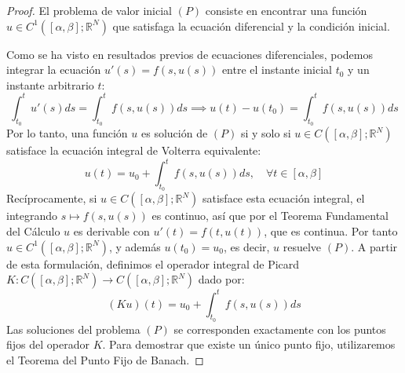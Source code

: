 \begin{proof}
    El problema de valor inicial $(P)$ consiste en encontrar una función $u \in C^1([\alpha, \beta]; \mathbb{R}^N)$ que satisfaga la ecuación diferencial y la condición inicial. 
    
    Como se ha visto en resultados previos de ecuaciones diferenciales, podemos integrar la ecuación $u'(s) = f(s, u(s))$ entre el instante inicial $t_0$ y un instante arbitrario $t$:
    \[
        \int_{t_0}^t u'(s) ds = \int_{t_0}^t f(s, u(s)) ds \implies u(t) - u(t_0) = \int_{t_0}^t f(s, u(s)) ds
    \]
    Por lo tanto, una función $u$ es solución de $(P)$ si y solo si $u \in C([\alpha, \beta]; \mathbb{R}^N)$ satisface la ecuación integral de Volterra equivalente:
    \[
        u(t) = u_0 + \int_{t_0}^t f(s, u(s)) ds, \quad \forall t \in [\alpha, \beta]
    \]
    Recíprocamente, si $u \in C([\alpha, \beta]; \mathbb{R}^N)$ satisface esta ecuación integral, el integrando $s \mapsto f(s, u(s))$ es continuo, así que por el Teorema Fundamental del Cálculo $u$ es derivable con $u'(t) = f(t, u(t))$, que es continua. Por tanto $u \in C^1([\alpha, \beta]; \mathbb{R}^N)$, y además $u(t_0) = u_0$, es decir, $u$ resuelve $(P)$.
    A partir de esta formulación, definimos el operador integral de Picard $K : C([\alpha, \beta]; \mathbb{R}^N) \to C([\alpha, \beta]; \mathbb{R}^N)$ dado por:
    \[
        (Ku)(t) = u_0 + \int_{t_0}^t f(s, u(s)) ds
    \]
    Las soluciones del problema $(P)$ se corresponden exactamente con los puntos fijos del operador $K$. Para demostrar que existe un único punto fijo, utilizaremos el Teorema del Punto Fijo de Banach. 
    

\end{proof}
